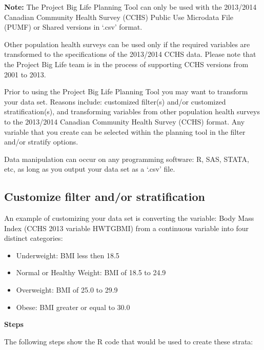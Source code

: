 \documentclass[]{book}
\providecommand{\tightlist}{%
  \setlength{\itemsep}{0pt}\setlength{\parskip}{0pt}}
\begin{document}
\textbf{Note:} The Project Big Life Planning Tool can only be used with
the 2013/2014 Canadian Community Health Survey (CCHS) Public Use
Microdata File (PUMF) or Shared versions in `.csv' format.

Other population health surveys can be used only if the required
variables are transformed to the specifications of the 2013/2014 CCHS
data. Please note that the Project Big Life team is in the process of
supporting CCHS versions from 2001 to 2013.

Prior to using the Project Big Life Planning Tool you may want to
transform your data set. Reasons include: customized filter(s) and/or
customized stratification(s), and transforming variables from other
population health surveys to the 2013/2014 Canadian Community Health
Survey (CCHS) format. Any variable that you create can be selected
within the planning tool in the filter and/or stratify options.

Data manipulation can occur on any programming software: R, SAS, STATA,
etc, as long as you output your data set as a `.csv' file.

\subsection{Customize filter and/or
stratification}\label{customize-filter-andor-stratification}

An example of customizing your data set is converting the variable: Body
Mass Index (CCHS 2013 variable HWTGBMI) from a continuous variable into
four distinct categories:

\begin{itemize}
\tightlist
\item
  Underweight: BMI less then 18.5
\item
  Normal or Healthy Weight: BMI of 18.5 to 24.9
\item
  Overweight: BMI of 25.0 to 29.9
\item
  Obese: BMI greater or equal to 30.0
\end{itemize}

\textbf{Steps}

The following steps show the R code that would be used to create these
strata:
\end{document}
